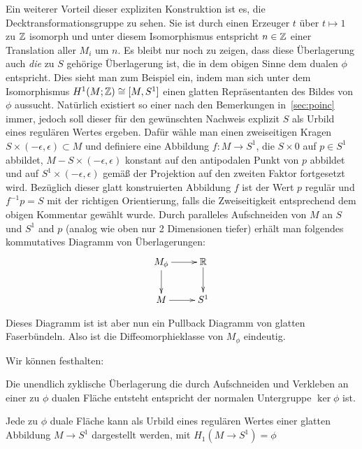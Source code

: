 \begin{constr}
	Ein weiterer Vorteil dieser expliziten Konstruktion ist es, die Decktransformationsgruppe zu sehen. Sie ist durch einen Erzeuger $t$ über $t\mapsto 1$ zu $\mathbb{Z}$ isomorph und unter diesem Isomorphismus entspricht $n\in \mathbb{Z}$ einer Translation aller $M_i$ um $n$. Es bleibt nur noch zu zeigen, dass diese Überlagerung auch \textit{die} zu $S$ gehörige Überlagerung ist, die in dem obigen Sinne dem dualen $\phi$ entspricht. Dies sieht man zum Beispiel ein, indem man sich unter dem Isomorphismus $H^1(M;\mathbb{Z})\cong [M,S^1]$ einen glatten Repräsentanten des Bildes von $\phi$ aussucht. Natürlich existiert so einer nach den Bemerkungen in~\ref{sec:poinc} immer, jedoch soll dieser für den gewünschten Nachweis explizit $S$ als Urbild eines regulären Wertes ergeben. Dafür wähle man einen zweiseitigen Kragen $S\times (-\epsilon,\epsilon) \subset M$ und definiere eine Abbildung $f:M\to S^1$, die $S\times 0$ auf $p\in S^1$ abbildet, $M-S \times (-\epsilon,\epsilon)$ konstant auf den antipodalen Punkt von $p$ abbildet und auf $S^1\times (-\epsilon,\epsilon)$ gemäß der Projektion auf den zweiten Faktor fortgesetzt wird. Bezüglich dieser glatt konstruierten Abbildung $f$ ist der Wert $p$ regulär und $f^{-1}p=S$ mit der richtigen Orientierung, falls die Zweiseitigkeit entsprechend dem obigen Kommentar gewählt wurde. Durch paralleles Aufschneiden von $M$ an $S$ und $S^1$ and $p$ (analog wie oben nur 2 Dimensionen tiefer) erhält man folgendes kommutatives Diagramm von Überlagerungen:
	\[
		\begin{xy}
			\xymatrix{M_\phi \ar[r] \ar[d] &\RR \ar[d]\\
						M \ar[r]& S^1}
		\end{xy}
	\]

	Dieses Diagramm ist ist aber nun ein Pullback Diagramm von glatten Faserbündeln. Also ist die Diffeomorphieklasse von $M_\phi$ eindeutig. 
\end{constr}
Wir können festhalten:
\begin{cor}
\label{cor:verklvertr}
		Die unendlich zyklische Überlagerung die durch Aufschneiden und Verkleben an einer zu $\phi$ dualen Fläche entsteht entspricht der normalen Untergruppe $ \ker\phi$ ist.
\end{cor}
\begin{cor}
\label{cor:preimage}
	Jede zu $\phi$ duale Fläche kann als Urbild eines regulären Wertes einer glatten Abbildung $M\to S^1$ dargestellt werden, mit $H_1(M \to S^1)=\phi$
\end{cor}

